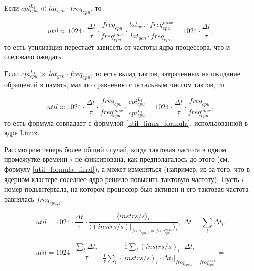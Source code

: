     Если $cpi_{cpu}^{L_1} \ll lat_{gen} \cdot freq_{cpu}$, то

    \begin{equation}
        util \approx 1024 \cdot \frac{\Delta t}{\tau} \cdot \frac{freq_{cpu}}{freq_{cpu}^{max}} \cdot
            \frac{lat_{gen} \cdot freq_{cpu}^{max}} {lat_{gen} \cdot freq_{cpu}} =
            1024 \cdot \frac{\Delta t}{\tau},
    \end{equation}
    то есть утилизация перестаёт зависеть от частоты ядра процессора,
    что и следовало ожидать.

    Если $cpi_{cpu}^{L_1} \gg lat_{gen} \cdot freq_{cpu}$, то есть вклад тактов, затраченных на ожидание
    обращений в память, мал по сравнению с остальным числом тактов, то

    \begin{equation}
        util \approx 1024 \cdot \frac{\Delta t}{\tau} \cdot \frac{freq_{cpu}}{freq_{cpu}^{max}} \cdot
            \frac{cpi_{cpu}^{L_1}} {cpi_{cpu}^{L_1}} = 1024 \cdot \frac{\Delta t}{\tau} \cdot
            \frac{freq_{cpu}}{freq_{cpu}^{max}},
    \end{equation}
    то есть формула совпадает с формулой \eqref{util_linux_formula}, использованной в ядре Linux.

    Рассмотрим теперь более общий случай, когда тактовая частота в одном промежутке времени $\tau$
    не фиксирована, как предполагалось до этого (см. формулу \eqref{util_formula_final}), а может
    изменяться (например, из-за того, что в ядерном кластере соседнее ядро решило повысить тактовую
    частоту). Пусть $i$ -- номер подынтервала, на котором процессор был активен и его тактовая
    частота равнялась $freq_{cpu, i}$.

    \begin{equation}
        util = 1024 \cdot \frac{\Delta t}{\tau} \cdot
            \frac{\langle instrs / s \rangle_t }{ \langle (instrs / s) |_{freq_{cpu, i} = freq_{cpu}^{max}} \rangle_t},
            \; \Delta t = \sum \limits_i \Delta t_i.
    \end{equation}

    \begin{equation}
        util = 1024 \cdot \frac{\sum \limits_i \Delta t_i}{\tau} \cdot
            \frac{\frac{1}{\tau} \sum \limits_i (instrs / s)_i \cdot \Delta t_i}
                 {\frac{1}{\tau} \sum \limits_i (instrs / s)_i \cdot \Delta t_i |_{freq_{cpu, i} = freq_{cpu}^{max}}} =
    \end{equation}

